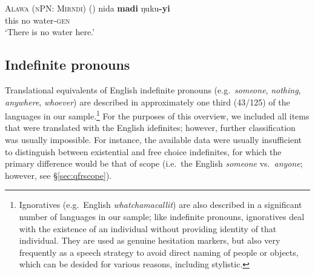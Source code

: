 \documentclass[12pt,egregdoesnotlikesansseriftitles]{scrartcl}
\makeatletter
\newcommand{\ofy}{/125} %
\makeatother
\begin{document}
\begin{exe}
 \ex \textsc{Alawa (nPN: Mirndi)} \hfill (\citealt[63]{sharpe72})
 \gll nida \textbf{madi} ŋuku\textbf{-yi} \\
this    no    water\textsc{-gen}\\
`There is no water here.' \label{alawanegex1}
\end{exe}

 

\subsection{Indefinite pronouns}
\label{sec:indefs}
Translational equivalents of English indefinite pronouns (e.g.\ \textit{someone}, \textit{nothing}, \textit{anywhere}, \textit{whoever}) are described in approximately one third (43\ofy) of the languages in our sample.\footnote{Ignoratives (e.g.\ English \textit{whatchamacallit}) are also described in a significant number of languages in our sample; like indefinite pronouns, ignoratives deal with the existence of an individual without providing identity of that individual. They are used as genuine hesitation markers, but also very frequently as a speech strategy to avoid direct naming of people or objects, which can be desided for various reasons, including stylistic.} For the purposes of this overview, we included all items that were translated with the English idefinites; however, further classification was usually impossible. For instance, the available data were usually insufficient to distinguish between existential and free choice indefinites, for which the primary difference would be that of scope (i.e.\ the English \textit{someone} vs.\ \textit{anyone}; however, see \S\ref{sec:qfrscope}).
\end{document}
